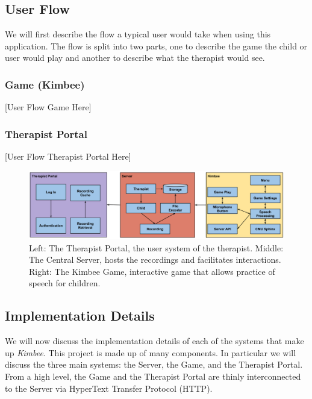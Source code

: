\documentclass{sig-alternate-2013}
\begin{document}
\subsection{User Flow}

We will first describe the flow a typical user would take when using this application. The flow is split into two parts, one to describe the game the child or user would play and another to describe what the therapist would see.

\subsubsection{Game (Kimbee)}

[User Flow Game Here]

\subsubsection{Therapist Portal}

[User Flow Therapist Portal Here]

\begin{figure}[t]
  \centering
  \includegraphics[keepaspectratio, width=\textwidth]{tech_figure.png}
  \caption{Left: The Therapist Portal, the user system of the therapist. Middle: The Central Server, hosts the recordings and facilitates interactions. Right: The Kimbee Game, interactive game that allows practice of speech for children. }
  \label{fig:tech}
\end{figure}

\subsection{Implementation Details}

We will now discuss the implementation details of each of the systems that make up {\em Kimbee}. This project is made up of many components. In particular we will discuss the three main systems: the Server, the Game, and the Therapist Portal. From a high level, the Game and the Therapist Portal are thinly interconnected to the Server via HyperText Transfer Protocol (HTTP).
\end{document}
